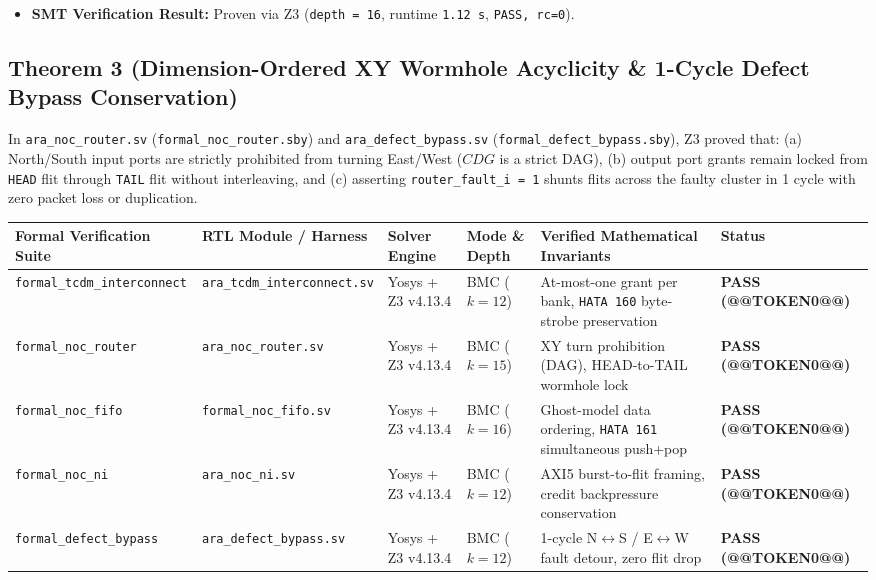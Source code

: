 \documentclass[journal,10pt,twocolumn]{IEEEtran}
\begin{document}
\begin{itemize}
  \item \textbf{SMT Verification Result:} Proven via Z3 (\texttt{depth = 16}, runtime \texttt{1.12 s}, \texttt{PASS, rc=0}).
\end{itemize}

\subsection{Theorem 3 (Dimension-Ordered XY Wormhole Acyclicity \& 1-Cycle Defect Bypass Conservation)}
In \texttt{ara\_noc\_router.sv} (\texttt{formal\_noc\_router.sby}) and \texttt{ara\_defect\_bypass.sv} (\texttt{formal\_defect\_bypass.sby}), Z3 proved that: (a) North/South input ports are strictly prohibited from turning East/West ($CDG$ is a strict DAG), (b) output port grants remain locked from \texttt{HEAD} flit through \texttt{TAIL} flit without interleaving, and (c) asserting \texttt{router\_fault\_i = 1} shunts flits across the faulty cluster in 1 cycle with zero packet loss or duplication.

\begin{table}[htbp]
\centering\footnotesize
\begin{tabular}{p{} p{} p{} p{} p{} p{}}
\toprule
\textbf{Formal Verification Suite} & \textbf{RTL Module / Harness} & \textbf{Solver Engine} & \textbf{Mode \& Depth} & \textbf{Verified Mathematical Invariants} & \textbf{Status} \\
\midrule
\texttt{formal\_tcdm\_interconnect} & \texttt{ara\_tcdm\_interconnect.sv} & Yosys + Z3 v4.13.4 & BMC ($k=12$) & At-most-one grant per bank, \texttt{HATA 160} byte-strobe preservation & \textbf{PASS (@@TOKEN0@@)} \\
\texttt{formal\_noc\_router} & \texttt{ara\_noc\_router.sv} & Yosys + Z3 v4.13.4 & BMC ($k=15$) & XY turn prohibition (DAG), HEAD-to-TAIL wormhole lock & \textbf{PASS (@@TOKEN0@@)} \\
\texttt{formal\_noc\_fifo} & \texttt{formal\_noc\_fifo.sv} & Yosys + Z3 v4.13.4 & BMC ($k=16$) & Ghost-model data ordering, \texttt{HATA 161} simultaneous push+pop & \textbf{PASS (@@TOKEN0@@)} \\
\texttt{formal\_noc\_ni} & \texttt{ara\_noc\_ni.sv} & Yosys + Z3 v4.13.4 & BMC ($k=12$) & AXI5 burst-to-flit framing, credit backpressure conservation & \textbf{PASS (@@TOKEN0@@)} \\
\texttt{formal\_defect\_bypass} & \texttt{ara\_defect\_bypass.sv} & Yosys + Z3 v4.13.4 & BMC ($k=12$) & 1-cycle N$\leftrightarrow$S / E$\leftrightarrow$W fault detour, zero flit drop & \textbf{PASS (@@TOKEN0@@)} \\
\bottomrule
\end{tabular}
\vspace{4pt}
\end{table}
\end{document}

